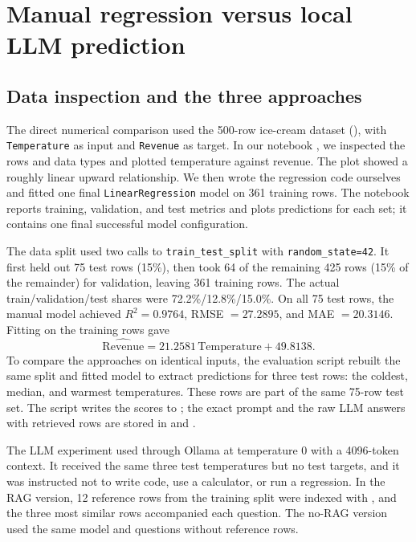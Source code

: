 \section{Manual regression versus local LLM prediction}
\subsection{Data inspection and the three approaches}
The direct numerical comparison used the 500-row ice-cream dataset
({\small{}}), with \texttt{Temperature} as input and \texttt{Revenue} as target.
In our notebook , we inspected the rows and data types and plotted temperature against revenue.
The plot showed a roughly linear upward relationship.
We then wrote the regression code ourselves and fitted one final \texttt{LinearRegression} model on 361 training rows.
The notebook reports training, validation, and test metrics and plots predictions for each set; it contains one final successful model configuration.

The data split used two calls to \texttt{train\_test\_split} with \texttt{random\_state=42}.
It first held out 75 test rows (15\%), then took 64 of the remaining 425 rows (15\% of the remainder) for validation, leaving 361 training rows.
The actual train/validation/test shares were 72.2\%/12.8\%/15.0\%.
On all 75 test rows, the manual model achieved $R^2=0.9764$, RMSE $=27.2895$, and MAE $=20.3146$.
Fitting on the training rows gave
\begin{equation}
\widehat{\mathrm{Revenue}}=21.2581\,\mathrm{Temperature}+49.8138.
\end{equation}
To compare the approaches on identical inputs, the evaluation script
 rebuilt the same split and fitted model to extract predictions for
three test rows: the coldest, median, and warmest temperatures.
These rows are part of the same 75-row test set.
The script writes the scores to ; the exact prompt and the raw LLM
answers with retrieved rows are stored in  and
.

The LLM experiment used  through Ollama at temperature 0 with a 4096-token context.
It received the same three test temperatures but no test targets, and it was instructed not to write code, use a calculator, or run a regression.
In the RAG version, 12 reference rows from the training split were indexed with , and the three most similar
rows accompanied each question.
The no-RAG version used the same model and questions without reference rows.

